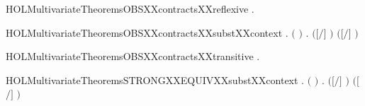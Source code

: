 \newcommand{\HOLMultivariateTheoremsOBSXXCONGRXXsubstXXcontext}{\UseVerbatim{HOLMultivariateTheoremsOBSXXCONGRXXsubstXXcontext}}
\begin{SaveVerbatim}{HOLMultivariateTheoremsOBSXXcontractsXXreflexive}
\HOLTokenTurnstile{} \HOLSymConst{\HOLTokenForall{}}.   
\end{SaveVerbatim}
\newcommand{\HOLMultivariateTheoremsOBSXXcontractsXXreflexive}{\UseVerbatim{HOLMultivariateTheoremsOBSXXcontractsXXreflexive}}
\begin{SaveVerbatim}{HOLMultivariateTheoremsOBSXXcontractsXXsubstXXcontext}
\HOLTokenTurnstile{} \HOLSymConst{\HOLTokenForall{}}  .
         \HOLSymConst{\HOLTokenConj{}} \ensuremath{(}  \HOLSymConst{\ensuremath{=}}  \ensuremath{)} \HOLSymConst{\HOLTokenConj{}}
          \HOLSymConst{\HOLTokenImp{}}
       \HOLSymConst{\HOLTokenForall{}}.    \HOLSymConst{\HOLTokenImp{}}  \ensuremath{(}\ensuremath{[}\ensuremath{/}\ensuremath{]} \ensuremath{)} \ensuremath{(}\ensuremath{[}\ensuremath{/}\ensuremath{]} \ensuremath{)}
\end{SaveVerbatim}
\newcommand{\HOLMultivariateTheoremsOBSXXcontractsXXsubstXXcontext}{\UseVerbatim{HOLMultivariateTheoremsOBSXXcontractsXXsubstXXcontext}}
\begin{SaveVerbatim}{HOLMultivariateTheoremsOBSXXcontractsXXtransitive}
\HOLTokenTurnstile{} \HOLSymConst{\HOLTokenForall{}}  .
          \HOLSymConst{\HOLTokenConj{}}    \HOLSymConst{\HOLTokenImp{}}
         
\end{SaveVerbatim}
\newcommand{\HOLMultivariateTheoremsOBSXXcontractsXXtransitive}{\UseVerbatim{HOLMultivariateTheoremsOBSXXcontractsXXtransitive}}
\begin{SaveVerbatim}{HOLMultivariateTheoremsSTRONGXXEQUIVXXsubstXXcontext}
\HOLTokenTurnstile{} \HOLSymConst{\HOLTokenForall{}}  .
         \HOLSymConst{\HOLTokenConj{}} \ensuremath{(}  \HOLSymConst{\ensuremath{=}}  \ensuremath{)} \HOLSymConst{\HOLTokenConj{}}
          \HOLSymConst{\HOLTokenImp{}}
       \HOLSymConst{\HOLTokenForall{}}.    \HOLSymConst{\HOLTokenImp{}}  \ensuremath{(}\ensuremath{[}\ensuremath{/}\ensuremath{]} \ensuremath{)} \ensuremath{(}\ensuremath{[}\ensuremath{/}\ensuremath{]} \ensuremath{)}
\end{SaveVerbatim}
